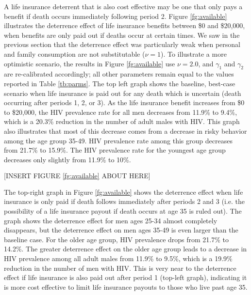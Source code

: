 \documentclass[12pt]{article}
\begin{document}
A life insurance deterrent that is also cost effective may be one that only pays a benefit if death occurs immediately following period 2.  Figure \ref{fg:available} illustrates the deterrence effect of life insurance benefits between \$0 and \$20,000, when benefits are only paid out if deaths occur at certain times.  We saw in the previous section that the deterrence effect was particularly weak when personal and family consumption are not substitutable ($\nu=1$).  To illustrate a more optimistic scenario, the results in Figure \ref{fg:available} use $\nu=2.0$, and $\gamma_1$ and $\gamma_2$ are re-calibrated accordingly; all other parameters remain equal to the values reported in Table \ref{tb:parms}.  The top left graph shows the baseline, best-case scenario when life insurance is paid out for any death which is uncertain (death occurring after periods 1, 2, or 3).  As the life insurance benefit increases from \$0 to \$20,000, the HIV prevalence rate for all men decreases from 11.9\% to 9.4\%, which is a 20.3\% reduction in the number of adult males with HIV.  This graph also illustrates that most of this decrease comes from a decrease in risky behavior among the age group 35-49.  HIV prevalence rate among this group decreases from 21.7\% to 15.9\%.  The HIV prevalence rate for the youngest age group decreases only slightly from 11.9\% to 10\%.

\begin{center}[INSERT FIGURE \ref{fg:available} ABOUT HERE]\end{center}

The top-right graph in Figure \ref{fg:available} shows the deterrence effect when life insurance is only paid if death follows immediately after periods 2 and 3 (i.e. the possibility of a life insurance payout if death occurs at age 35 is ruled out).  The graph shows the deterrence effect for men ages 25-34 almost completely disappears, but the deterrence effect on men ages 35-49 is even larger than the baseline case.  For the older age group, HIV prevalence drops from 21.7\% to 14.2\%.  The greater deterrence effect on the older age group leads to a decrease in HIV prevalence among all adult males from 11.9\% to 9.5\%, which is a 19.9\% reduction in the number of men with HIV.  This is very near to the deterrence effect if life insurance is also paid out after period 1 (top-left graph), indicating it is more cost effective to limit life insurance payouts to those who live past age 35.
\end{document}
